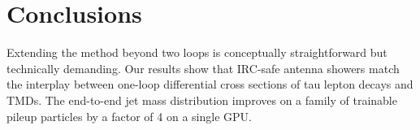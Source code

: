 \section{Conclusions}\label{sec:conclusions}

Extending the method beyond two loops is conceptually straightforward
but technically demanding. Our results show that IRC-safe antenna
showers match the interplay between one-loop differential cross sections
of tau lepton decays and TMDs. The end-to-end jet mass distribution
improves on a family of trainable pileup particles by a factor of 4 on a
single GPU.

